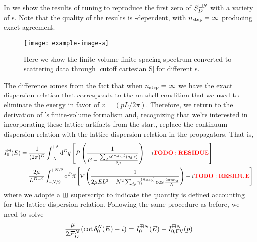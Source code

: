 In  we show the results of tuning to reproduce the first zero of $S_D^{\square N}$ with a variety of {\nstep}s.
Note that the quality of the results is \nstep-dependent, with ${n_\text{step}}=\infty$ producing exact agreement.

\begin{figure}
    \texttt{[image: example-image-a]}
    \caption{Here we show the finite-volume finite-spacing spectrum converted to scattering data through \eqref{cutoff cartesian S} for different {\nstep}s.
    }
    \label{fig:results cutoff cartesian S}
\end{figure}

The difference comes from the fact that when ${n_\text{step}}=\infty$ we have the exact dispersion relation that corresponds to the on-shell condition that we used to eliminate the energy in favor of $x=(pL/2\pi)$.
Therefore, we return to the derivation of \Luscher's finite-volume formalism and, recognizing that we're interested in incorporating these lattice artifacts from the start, replace the continuum dispersion relation with the lattice dispersion relation in the propagators.
That is,
\begin{align}
    I_0^{\boxplus}(E)
    &=\frac{1}{(2\pi)^D}
    \int_{-\Lambda}^{+\Lambda}
        \mathrm{d}^D \vec{q}
        \left[
            \mathcal{P} \left( \frac { 1 } { E - \frac{\sum_d \omega^{({n_\text{step}})}(q_d,\epsilon)}{2\mu} } \right)
            -i {\bf\color{red}TODO: RESIDUE}
        \right]
    \\
    &=\frac{2\mu}{L^{D-2}}
    \int_{-N/2}^{+N/2}
        \mathrm{d}^D\vec{n}
        \left[
            \mathcal{P} \left( \frac { 1 } { 2\mu E L^2 - N^2 \sum_{ds} \gamma_s^{({n_\text{step}})} \cos \frac{2\pi s n_d}{N}} \right)
            -i {\bf\color{red}TODO: RESIDUE}
        \right]
    \label{eq:dispersion I0}
\end{align}
where we adopte a $\boxplus$ superscript to indicate the quantity is defined accounting for the lattice dispersion relation.
Following the same procedure as before, we need to solve
\begin{equation}
    \frac{\mu}{2\mathcal{F}_D^N}(\cot \delta_0^N(E) - i) = I_0^{\boxplus N}(E) - I_{0,\textrm{FV}}^{\boxplus N}(p)
\end{equation}

